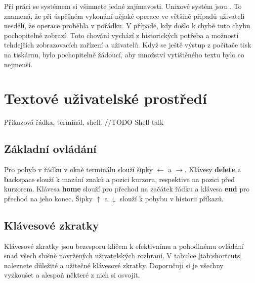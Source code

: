 \documentclass{article}
\begin{document}
Při práci se systémem si všimnete jedné zajímavosti. Unixové systém jsou . To znamená, že při úspěšném vykonání nějaké operace ve většině případů uživateli nesdělí, že operace proběhla v pořádku. V případě, kdy došlo k chybě tuto chybu pochopitelně zobrazí. Toto chování vychází z historických potřeba a možností tehdejších zobrazovacích zařízení a uživatelů. Když se ještě výstup z počítače tisk na tiskárnu, bylo pochopitelně žádoucí, aby množství vytištěného textu bylo co nejmenší.

\section{Textové uživatelské prostředí}
Příkazová řádka, terminál, shell.
//TODO Shell-talk
\subsection{Základní ovládání}
Pro pohyb v řádku v okně terminálu slouží šipky $\leftarrow$ a $\rightarrow$. Klávesy \textbf{delete} a {\textbf backspace} slouží k mazání znaků a pozici kurzoru, respektive na pozici před kurzorem. Klávesa \textbf{home} slouží pro přechod na začátek řádku a klávesa \textbf{end} pro přechod na jeho konec. Šipky $\uparrow$ a $\downarrow$ slouží k pohybu v historii příkazů.

\subsection{Klávesové zkratky}
Klávesové zkratky jsou bezesporu klíčem k efektivnímu a pohodlnému ovládání snad všech slušně navržených uživatelských rozhraní. V tabulce \ref{tab:shortcuts} naleznete důležité a užitečné klávesové zkratky. Doporučuji si je všechny vyzkoušet a alespoň některé z nich si osvojit.
\end{document}
